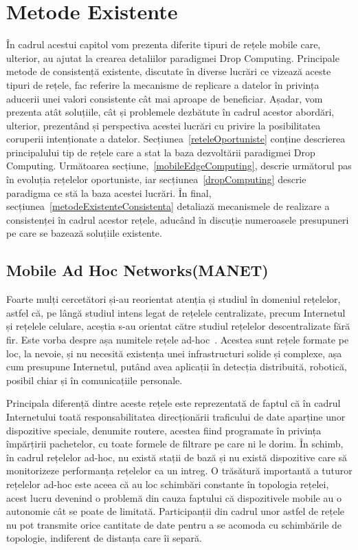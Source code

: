 \documentclass[12pt,a4paper]{report}
\begin{document}
\chapter{Metode Existente} \label{metodeExistente}
În cadrul acestui capitol vom prezenta diferite tipuri de rețele mobile care, ulterior, au ajutat la crearea detaliilor paradigmei Drop Computing. Principale metode de consistență existente, discutate în diverse lucrări ce vizează aceste tipuri de rețele, fac referire la mecanisme de replicare a datelor în privința aducerii unei valori consistente cât mai aproape de beneficiar. Așadar, vom prezenta atât soluțiile, cât și problemele dezbătute în cadrul acestor abordări, ulterior, prezentând și perspectiva acestei lucrări cu privire la posibilitatea coruperii intenționate a datelor.
Secțiunea~\ref{reteleOportuniste} conține descrierea principalului tip de rețele care a stat la baza dezvoltării paradigmei Drop Computing. Următoarea secțiune,~\ref{mobileEdgeComputing}, descrie următorul pas în evoluția rețelelor oportuniste, iar secțiunea~\ref{dropComputing} descrie paradigma ce stă la baza acestei lucrări. În final, secțiunea~\ref{metodeExistenteConsistenta} detaliază mecanismele de realizare a consistenței în cadrul acestor rețele, aducând în discuție numeroasele presupuneri pe care se bazează soluțiile existente.  
 
\iffalse 
\section{Mobile Ad Hoc Networks(MANET)}
Foarte mulți cercetători și-au reorientat atenția și studiul în domeniul rețelelor, astfel că, pe lângă studiul intens legat de rețelele centralizate, precum Internetul și rețelele celulare, aceștia s-au orientat către studiul rețelelor descentralizate fără fir. Este vorba despre așa numitele rețele ad-hoc~\cite{MITArticle}. Acestea sunt rețele formate pe loc, la nevoie, și nu necesită existența unei infrastructuri solide și complexe, așa cum presupune Internetul, putând avea aplicații în detecția distribuită, robotică, posibil chiar și în comunicațiile personale.

Principala diferență dintre aceste rețele este reprezentată de faptul că în cadrul Internetului toată responsabilitatea direcționării traficului de date aparține unor dispozitive speciale, denumite routere, acestea fiind programate în privința împărțirii pachetelor, cu toate formele de filtrare pe care ni le dorim. În schimb, în cadrul rețelelor ad-hoc, nu există stații de bază și nu există dispozitive care să monitorizeze performanța rețelelor ca un intreg. O trăsătură importantă a tuturor rețelelor ad-hoc este aceea că au loc schimbări constante în topologia rețelei, acest lucru devenind o problemă din cauza faptului că dispozitivele mobile au o autonomie cât se poate de limitată. Participanții din cadrul unor astfel de rețele nu pot transmite orice cantitate de date pentru a se acomoda cu schimbările de topologie, indiferent de distanța care îi separă.
\end{document}
